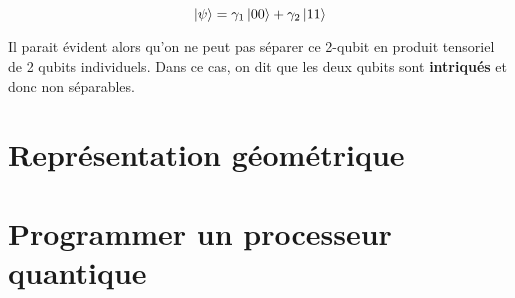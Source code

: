 \[
\ket{\psi} = \gamma_1 \ket{00} + \gamma_2 \ket{11}
\]

Il parait évident alors qu'on ne peut pas séparer ce 2-qubit en produit tensoriel de 2 qubits individuels. Dans ce cas, on dit que les deux qubits sont \textbf{intriqués} et donc non séparables.

\section{Représentation géométrique}

\section{Programmer un processeur quantique}